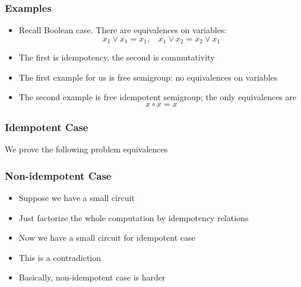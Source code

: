 \documentclass{beamer}
\begin{document}
\begin{frame}
\frametitle{Examples}

\begin{itemize}[<+->]
\item Recall Boolean case. There are equivalences on variables:
$$
x_1 \vee x_1 = x_1, \ \ \ \ x_1 \vee x_2 = x_2 \vee x_1
$$
\item The first is idempotency, the second is commutativity
\item The first example for us is free semigroup: no equivalences on variables
\item The second example is free idempotent semigroup; the only equivalences are
$$
x \circ x = x
$$
\end{itemize}



\end{frame}

\begin{frame}
\frametitle{Idempotent Case}

We prove the following problem equivalences 

\begin{center}
\end{center}



\end{frame}

\begin{frame}
\frametitle{Non-idempotent Case}

\begin{itemize}
\item Suppose we have a small circuit
\item Just factorize the whole computation by idempotency relations
\item Now we have a small circuit for idempotent case
\item This is a contradiction
\item Basically, non-idempotent case is harder
\end{itemize}



\end{frame}
\end{document}
